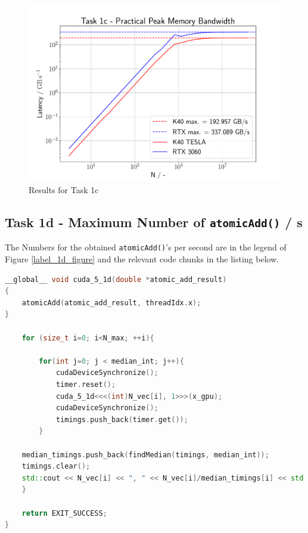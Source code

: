\begin{figure}[h]
  \begin{center}
    \includegraphics[width= 0.8\linewidth]{figures/task_1_c.pdf}
    \caption{Results for Task 1c}
    \label{label_1c_figure}
  \end{center}
\end{figure}



\pagebreak

\subsection{Task 1d - Maximum Number of \texttt{atomicAdd()} / s}
The Numbers for the obtained \texttt{atomicAdd()}'s per second are in the legend of Figure \ref{label_1d_figure} and the relevant code chunks in the listing below.

\begin{lstlisting}[language=C++, title=C++ Cuda Code for Maximum number of \texttt{atomicAdd()}]
__global__ void cuda_5_1d(double *atomic_add_result)
{
	atomicAdd(atomic_add_result, threadIdx.x);
}
   
    for (size_t i=0; i<N_max; ++i){

        for(int j=0; j < median_int; j++){
            cudaDeviceSynchronize();
            timer.reset();
            cuda_5_1d<<<(int)N_vec[i], 1>>>(x_gpu);
            cudaDeviceSynchronize();
            timings.push_back(timer.get());
        }

    median_timings.push_back(findMedian(timings, median_int));
    timings.clear();
    std::cout << N_vec[i] << ", " << N_vec[i]/median_timings[i] << std::endl;
    }

    return EXIT_SUCCESS;
}


\end{lstlisting}

